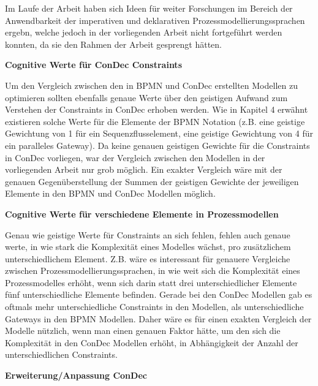 Im Laufe der Arbeit haben sich Ideen für weiter Forschungen im Bereich der Anwendbarkeit der imperativen und deklarativen Prozessmodellierungssprachen ergebn, welche jedoch in der vorliegenden Arbeit nicht fortgeführt werden konnten, da sie den Rahmen der Arbeit gesprengt hätten.\newline

\textbf{Cognitive Werte für ConDec Constraints}

Um den Vergleich zwischen den in BPMN und ConDec erstellten Modellen zu optimieren sollten ebenfalls genaue Werte über den geistigen Aufwand zum Verstehen der Constraints in ConDec erhoben werden. Wie in Kapitel 4 erwähnt existieren solche Werte für die Elemente der BPMN Notation (z.B. eine geistige Gewichtung von 1 für ein Sequenzflusselement, eine geistige Gewichtung von 4 für ein paralleles Gateway). Da keine genauen geistigen Gewichte für die Constraints in ConDec vorliegen, war der Vergleich zwischen den Modellen in der vorliegenden Arbeit nur grob möglich. Ein exakter Vergleich wäre mit der genauen Gegenüberstellung der Summen der geistigen Gewichte der jeweiligen Elemente in den BPMN und ConDec Modellen möglich.\newline

\textbf{Cognitive Werte für verschiedene Elemente in Prozessmodellen}

Genau wie geistige Werte für Constraints an sich fehlen, fehlen auch genaue werte, in wie stark die Komplexität eines Modelles wächst, pro zusätzlichem unterschiedlichem Element. Z.B. wäre es interessant für genauere Vergleiche zwischen Prozessmodellierungssprachen, in wie weit sich die Komplexität eines Prozessmodelles erhöht, wenn sich darin statt drei unterschiedlicher Elemente fünf unterschiedliche Elemente befinden. Gerade bei den ConDec Modellen gab es oftmals mehr unterschiedliche Constraints in den Modellen, als unterschiedliche Gateways in den BPMN Modellen. Daher wäre es für einen exakten Vergleich der Modelle nützlich, wenn man einen genauen Faktor hätte, um den sich die Komplexität in den ConDec Modellen erhöht, in Abhängigkeit der Anzahl der unterschiedlichen Constraints.  


\textbf{Erweiterung/Anpassung ConDec}

